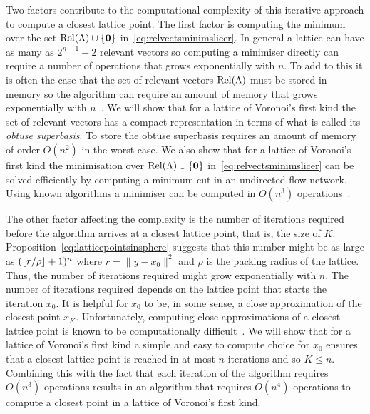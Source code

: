 \documentclass[final,leqno]{siamltex}
\begin{document}
Two factors contribute to the computational complexity of this iterative approach to compute a closest lattice point.  The first factor is computing the minimum over the set $\operatorname{Rel}(\Lambda) \cup \{\boldsymbol{0}\}$ in~\eqref{eq:relvectsminimslicer}.  In general a lattice can have as many as $2^{n+1}-2$ relevant vectors so computing a minimiser directly can require a number of operations that grows exponentially with $n$.  To add to this it is often the case that the set of relevant vectors $\operatorname{Rel}(\Lambda)$ must be stored in memory so the algorithm can require an amount of memory that grows exponentially with $n$~\cite{MicciancioVoulgaris_deterministic_jv_2013}\cite{Shalvi_iterativeslicer_2009}.  We will show that for a lattice of Voronoi's first kind the set of relevant vectors has a compact representation in terms of what is called its \emph{obtuse superbasis}.  To store the obtuse superbasis requires an amount of memory of order $O(n^2)$ in the worst case.  We also show that for a lattice of Voronoi's first kind the minimisation over $\operatorname{Rel}(\Lambda) \cup \{\boldsymbol{0}\}$ in~\eqref{eq:relvectsminimslicer} can be solved efficiently by computing a minimum cut in an undirected flow network.  Using known algorithms a minimiser can be computed in $O(n^3)$ operations~\cite{Goldberg:1986:NAM:12130.12144,EdmondsKarp_max_flow,Cormen2001}. 

The other factor affecting the complexity is the number of iterations required before the algorithm arrives at a closest lattice point, that is, the size of $K$.  Proposition~\ref{eq:latticepointsinsphere} suggests that this number might be as large as $({\left\lfloor r/\rho \right\rfloor}+1)^n$ where $r = \|y - x_0\|^2$ and $\rho$ is the packing radius of the lattice.  Thus, the number of iterations required might grow exponentially with $n$.  The number of iterations required depends on the lattice point that starts the iteration $x_0$.  It is helpful for $x_0$ to be, in some sense, a close approximation of the closest point $x_K$.  Unfortunately, computing close approximations of a closest lattice point is known to be computationally difficult~\cite{feige_inapproximability_2004,Regev_2004_inappox_lattice_with_preprocessing,Aharonov_Regev_2005,Aleknovish_hardness_with_preprocessing_2011,Dadush_cvp_with_distance_guarantee_2014}.  We will show that for a lattice of Voronoi's first kind a simple and easy to compute choice for $x_0$ ensures that a closest lattice point is reached in at most $n$ iterations and so $K \leq n$.  Combining this with the fact that each iteration of the algorithm requires $O(n^3)$ operations results in an algorithm that requires $O(n^4)$ operations to compute a closest point in a lattice of Voronoi's first kind. 
\end{document}
